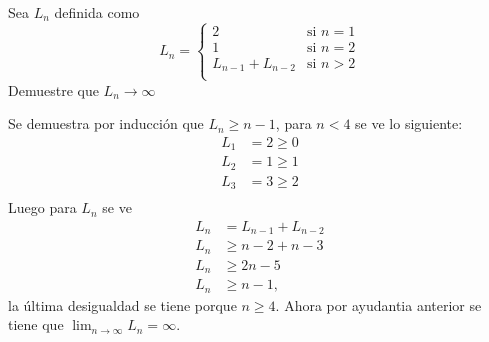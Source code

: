 \documentclass{ayudantia}
\begin{document}
\begin{prob}
    Sea \(L_n\) definida como
    \begin{equation*}
        L_n=\begin{cases}
            2               & \text{si }n=1 \\
            1               & \text{si }n=2 \\
            L_{n-1}+L_{n-2} & \text{si }n>2 \\
        \end{cases}
    \end{equation*}
    Demuestre que \(L_n\rightarrow\infty\)
\end{prob}

\begin{ans}
    \begin{sol}
        Se demuestra por inducción que \(L_n\geq n-1\), para \(n<4\) se ve lo siguiente:
        \begin{align*}
            L_1&=2\geq0\\
            L_2&=1\geq1\\
            L_3&=3\geq2\\
        \end{align*}
        Luego para \(L_n\) se ve
        \begin{align*}
            L_n&=L_{n-1}+L_{n-2}\\
            L_n&\geq n-2+n-3\\
            L_n&\geq 2n-5\\
            L_n&\geq n-1,
        \end{align*}
        la última desigualdad se tiene porque \(n\geq 4\). Ahora por ayudantia anterior se tiene que \(\lim_{n\rightarrow\infty}L_n=\infty\).
    \end{sol}
\end{ans}
\end{document}
